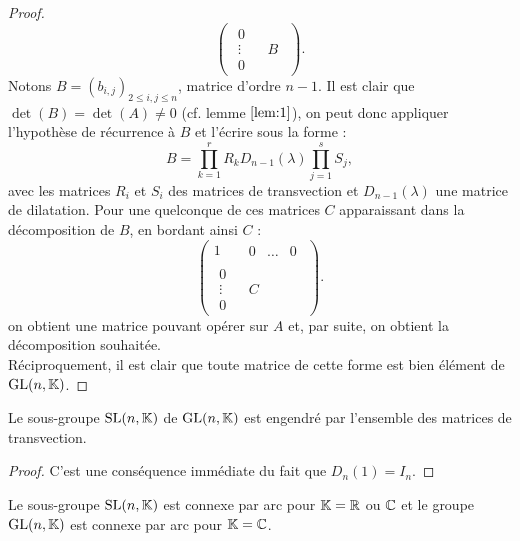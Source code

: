\begin{proof}
\[\begin{pmatrix}
\begin{matrix} 0 \\ \vdots \\ 0 \end{matrix} & \begin{matrix} B \end{matrix}
\end{pmatrix} . \]
Notons $B = (b_{i,j})_{2 \leq i,j \leq n}$, matrice d'ordre $n-1$. Il est clair que $\det(B)=\det(A) \neq 0$ (cf. lemme $\ref{lem:1}$),
on peut donc appliquer l'hypothèse de récurrence à $B$ et l'écrire sous la forme :
\[ B = \prod_{k=1}^r R_k D_{n-1}(\lambda) \prod_{j=1}^s S_j, \]
avec les matrices $R_i$ et $S_i$ des matrices de transvection et $D_{n-1}(\lambda)$ une matrice de dilatation.
Pour une quelconque de ces matrices $C$ apparaissant dans la décomposition de $B$, en bordant ainsi $C$ :
\[ \begin{pmatrix} 
1 & \begin{matrix} 0 & \dots & 0 \end{matrix} \\
\begin{matrix} 0 \\ \vdots \\ 0 \end{matrix} & \begin{matrix} C \end{matrix}
\end{pmatrix} . \]
on obtient une matrice pouvant opérer sur $A$ et, par suite, on obtient la décomposition souhaitée. \\
Réciproquement, il est clair que toute matrice de cette forme est bien élément de $\text{GL}(n,\mathbb{K})$.
\end{proof}

\begin{coro}
Le sous-groupe $\text{SL}(n,\mathbb{K})$ de $\text{GL}(n,\mathbb{K})$ est engendré par l'ensemble des matrices de transvection.
\end{coro}

\begin{proof}
C'est une conséquence immédiate du fait que $D_n(1) = I_n$.
\end{proof}

\begin{coro}
Le sous-groupe $\text{SL}(n,\mathbb{K})$ est connexe par arc pour $\mathbb{K} = \mathbb{R}$ ou $\mathbb{C}$ et le groupe $\text{GL}(n,\mathbb{K})$ est connexe par arc pour $\mathbb{K} = \mathbb{C}$.
\end{coro}

